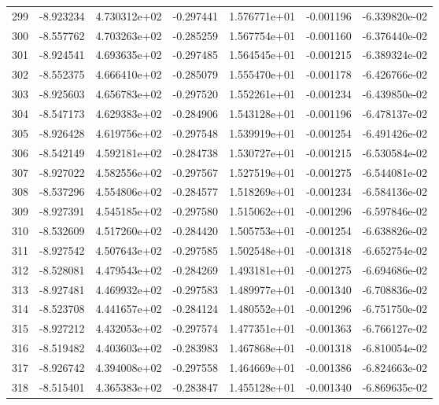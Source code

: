 \begin{tabular}{rrrrrrr}
 299 &  -8.923234 &  4.730312e+02 & -0.297441 &  1.576771e+01 &   -0.001196 & -6.339820e-02 \\
 300 &  -8.557762 &  4.703263e+02 & -0.285259 &  1.567754e+01 &   -0.001160 & -6.376440e-02 \\
 301 &  -8.924541 &  4.693635e+02 & -0.297485 &  1.564545e+01 &   -0.001215 & -6.389324e-02 \\
 302 &  -8.552375 &  4.666410e+02 & -0.285079 &  1.555470e+01 &   -0.001178 & -6.426766e-02 \\
 303 &  -8.925603 &  4.656783e+02 & -0.297520 &  1.552261e+01 &   -0.001234 & -6.439850e-02 \\
 304 &  -8.547173 &  4.629383e+02 & -0.284906 &  1.543128e+01 &   -0.001196 & -6.478137e-02 \\
 305 &  -8.926428 &  4.619756e+02 & -0.297548 &  1.539919e+01 &   -0.001254 & -6.491426e-02 \\
 306 &  -8.542149 &  4.592181e+02 & -0.284738 &  1.530727e+01 &   -0.001215 & -6.530584e-02 \\
 307 &  -8.927022 &  4.582556e+02 & -0.297567 &  1.527519e+01 &   -0.001275 & -6.544081e-02 \\
 308 &  -8.537296 &  4.554806e+02 & -0.284577 &  1.518269e+01 &   -0.001234 & -6.584136e-02 \\
 309 &  -8.927391 &  4.545185e+02 & -0.297580 &  1.515062e+01 &   -0.001296 & -6.597846e-02 \\
 310 &  -8.532609 &  4.517260e+02 & -0.284420 &  1.505753e+01 &   -0.001254 & -6.638826e-02 \\
 311 &  -8.927542 &  4.507643e+02 & -0.297585 &  1.502548e+01 &   -0.001318 & -6.652754e-02 \\
 312 &  -8.528081 &  4.479543e+02 & -0.284269 &  1.493181e+01 &   -0.001275 & -6.694686e-02 \\
 313 &  -8.927481 &  4.469932e+02 & -0.297583 &  1.489977e+01 &   -0.001340 & -6.708836e-02 \\
 314 &  -8.523708 &  4.441657e+02 & -0.284124 &  1.480552e+01 &   -0.001296 & -6.751750e-02 \\
 315 &  -8.927212 &  4.432053e+02 & -0.297574 &  1.477351e+01 &   -0.001363 & -6.766127e-02 \\
 316 &  -8.519482 &  4.403603e+02 & -0.283983 &  1.467868e+01 &   -0.001318 & -6.810054e-02 \\
 317 &  -8.926742 &  4.394008e+02 & -0.297558 &  1.464669e+01 &   -0.001386 & -6.824663e-02 \\
 318 &  -8.515401 &  4.365383e+02 & -0.283847 &  1.455128e+01 &   -0.001340 & -6.869635e-02 \\

\end{tabular}
